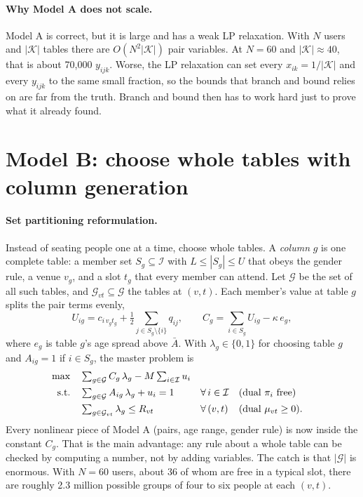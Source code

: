\documentclass[10pt]{article}
\newcommand{\I}{\mathcal{I}}
\newcommand{\K}{\mathcal{K}}
\newcommand{\G}{\mathcal{G}}
\begin{document}
\paragraph{Why Model A does not scale.} Model A is correct, but it is large and has a weak LP relaxation. With $N$ users and $|\K|$ tables there are $O(N^2|\K|)$ pair variables. At $N=60$ and $|\K|\approx 40$, that is about 70{,}000 $y_{ijk}$. Worse, the LP relaxation can set every $x_{ik}=1/|\K|$ and every $y_{ijk}$ to the same small fraction, so the bounds that branch and bound relies on are far from the truth. Branch and bound then has to work hard just to prove what it already found.

\section{Model B: choose whole tables with column generation}
\label{sec:modelB}

\paragraph{Set partitioning reformulation.} Instead of seating people one at a time, choose whole tables. A \emph{column} $g$ is one complete table: a member set $S_g\subseteq\I$ with $L\le|S_g|\le U$ that obeys the gender rule, a venue $v_g$, and a slot $t_g$ that every member can attend. Let $\G$ be the set of all such tables, and $\G_{vt}\subseteq\G$ the tables at $(v,t)$. Each member's value at table $g$ splits the pair terms evenly,
\begin{equation}
U_{ig} = c_{i\,v_g t_g} + \tfrac12\textstyle\sum_{j\in S_g\setminus\{i\}} q_{ij},
\qquad
C_g = \textstyle\sum_{i\in S_g} U_{ig} - \kappa\, e_g ,
\end{equation}
where $e_g$ is table $g$'s age spread above $\bar A$. With $\lambda_g\in\{0,1\}$ for choosing table $g$ and $A_{ig}=1$ if $i\in S_g$, the master problem is
\begin{align}
\max\quad & \textstyle\sum_{g\in\G} C_g\,\lambda_g - M\sum_{i\in\I} u_i \label{eq:master}\\
\text{s.t.}\quad & \textstyle\sum_{g\in\G} A_{ig}\,\lambda_g + u_i = 1 && \forall\, i\in\I && (\text{dual } \pi_i\ \text{free}) \notag\\
& \textstyle\sum_{g\in\G_{vt}} \lambda_g \le R_{vt} && \forall\, (v,t) && (\text{dual } \mu_{vt}\ge 0). \notag
\end{align}
Every nonlinear piece of Model A (pairs, age range, gender rule) is now inside the constant $C_g$. That is the main advantage: any rule about a whole table can be checked by computing a number, not by adding variables. The catch is that $|\G|$ is enormous. With $N=60$ users, about 36 of whom are free in a typical slot, there are roughly 2.3 million possible groups of four to six people at each $(v,t)$.
\end{document}
